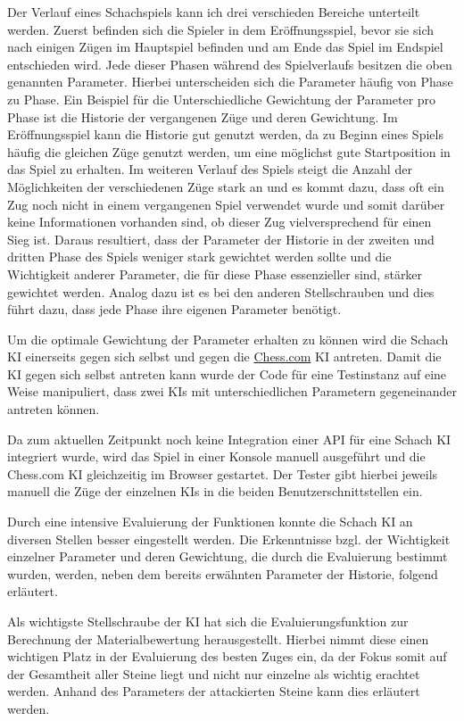 Der Verlauf eines Schachspiels kann ich drei verschieden Bereiche unterteilt werden. Zuerst befinden sich die Spieler in dem Eröffnungsspiel, bevor sie sich nach einigen Zügen im Hauptspiel befinden und am Ende das Spiel im Endspiel entschieden wird. Jede dieser Phasen während des Spielverlaufs besitzen die oben genannten Parameter. Hierbei unterscheiden sich die Parameter häufig von Phase zu Phase. Ein Beispiel für die Unterschiedliche Gewichtung der Parameter pro Phase ist die Historie der vergangenen Züge und deren Gewichtung. Im Eröffnungsspiel kann die Historie gut genutzt werden, da zu Beginn eines Spiels häufig die gleichen Züge genutzt werden, um eine möglichst gute Startposition in das Spiel zu erhalten. Im weiteren Verlauf des Spiels steigt die Anzahl der Möglichkeiten der verschiedenen Züge stark an und es kommt dazu, dass oft ein Zug noch nicht in einem vergangenen Spiel verwendet wurde und somit darüber keine Informationen vorhanden sind, ob dieser Zug vielversprechend für einen Sieg ist. Daraus resultiert, dass der Parameter der Historie in der zweiten und dritten Phase des Spiels weniger stark gewichtet werden sollte und die Wichtigkeit anderer Parameter, die für diese Phase essenzieller sind, stärker gewichtet werden. Analog dazu ist es bei den anderen Stellschrauben und dies führt dazu, dass jede Phase ihre eigenen Parameter benötigt. 

Um die optimale Gewichtung der Parameter erhalten zu können wird die Schach KI einerseits gegen sich selbst und gegen die \href{https://www.chess.com}{Chess.com} KI antreten. Damit die KI gegen sich selbst antreten kann wurde der Code für eine Testinstanz auf eine Weise manipuliert, dass zwei KIs mit unterschiedlichen Parametern gegeneinander antreten können. 

Da zum aktuellen Zeitpunkt noch keine Integration einer API für eine Schach KI integriert wurde, wird das Spiel in einer Konsole manuell ausgeführt und die Chess.com KI gleichzeitig im Browser gestartet. Der Tester gibt hierbei jeweils manuell die Züge der einzelnen KIs in die beiden Benutzerschnittstellen ein.

Durch eine intensive Evaluierung der Funktionen konnte die Schach KI an diversen Stellen besser eingestellt werden. Die Erkenntnisse bzgl. der Wichtigkeit einzelner Parameter und deren Gewichtung, die durch die Evaluierung bestimmt wurden, werden, neben dem bereits erwähnten Parameter der Historie, folgend erläutert.

Als wichtigste Stellschraube der KI hat sich die Evaluierungsfunktion zur Berechnung der Materialbewertung herausgestellt. Hierbei nimmt diese einen wichtigen Platz in der Evaluierung des besten Zuges ein, da der Fokus somit auf der Gesamtheit aller Steine liegt und nicht nur einzelne als wichtig erachtet werden. Anhand des Parameters der attackierten Steine kann dies erläutert werden.

